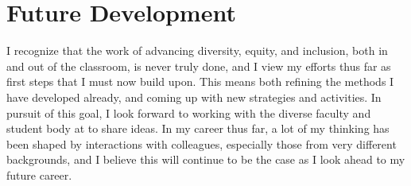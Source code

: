 \documentclass[12pt,letterpaper]{article}
\begin{document}
\section{Future Development}
I recognize that the work of advancing diversity, equity, and inclusion, both in and out of the classroom, is never truly done, and I view my efforts thus far as first steps that I must now build upon.
This means both refining the methods I have developed already, and coming up with new strategies and activities.
In pursuit of this goal, I look forward to working with the diverse faculty and student body at \schoolname to share ideas.
In my career thus far, a lot of my thinking has been shaped by interactions with colleagues, especially those from very different backgrounds, and I believe this will continue to be the case as I look ahead to my future career.
\end{document}
